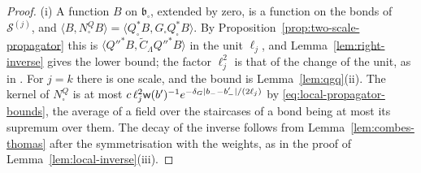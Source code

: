 \documentclass[11pt]{preprint}
\DeclarePairedDelimiter{\abs}{\lvert}{\rvert}
\numberwithin{equation}{section}
\theoremstyle{definition}
\theoremstyle{remark}
\theoremstyle{plain}
\begin{document}
\begin{proof}
(i) A function $B$ on $\mathfrak b_\square$, extended by zero, is a function on the bonds of $\mathcal S^{(j)}$, and $\langle B, N^Q_\square B\rangle = \langle Q_\square^*B, G_\square Q_\square^*B\rangle$. By Proposition~\ref{prop:two-scale-propagator} this is $\langle Q''^*B, \tilde C_\Lambda Q''^*B\rangle$ in the unit $\ell_j$, and Lemma~\ref{lem:right-inverse} gives the lower bound; the factor $\ell_j^2$ is that of the change of the unit, as in \cite[(2.144)]{BalabanPRT2}. For $j = k$ there is one scale, and the bound is Lemma~\ref{lem:qgq}(ii). The kernel of $N^Q_\square$ is at most $c\,\ell_j^2\mathsf w(b')^{-1}e^{-\delta_G\abs{b_- - b'_-}/(2\ell_j)}$ by \eqref{eq:local-propagator-bounds}, the average of a field over the staircases of a bond being at most its supremum over them. The decay of the inverse follows from Lemma~\ref{lem:combes-thomas} after the symmetrisation with the weights, as in the proof of Lemma~\ref{lem:local-inverse}(iii).


\end{proof}
\end{document}
